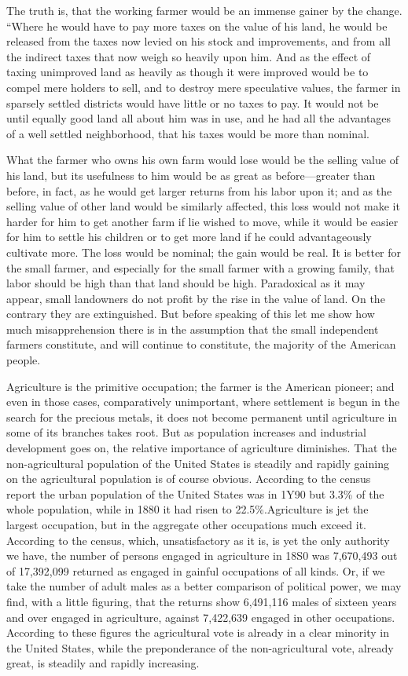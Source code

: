 \documentclass{book}
\begin{document}
The truth is, that the working farmer would be an immense gainer by the change. “Where he would have to pay more taxes on the value of his land, he would be released from the taxes now levied on his stock and improvements, and from all the indirect taxes that now weigh so heavily upon him. And as the effect of taxing unimproved land as heavily as though it were improved would be to compel mere holders to sell, and to destroy mere speculative values, the farmer in sparsely settled districts would have little or no taxes to pay. It would not be until equally good land all about him was in use, and he had all the advantages of a well settled neighborhood, that his taxes would be more than nominal.

What the farmer who owns his own farm would lose would be the selling value of his land, but its usefulness to him would be as great as before—greater than before, in fact, as he would get larger returns from his labor upon it; and as the selling value of other land would be similarly affected, this loss would not make it harder for him to get another farm if lie wished to move, while it would be easier for him to settle his children or to get more land if he could advantageously cultivate more. The loss would be nominal; the gain would be real. It is better for the small farmer, and especially for the small farmer with a growing family, that labor should be high than that land should be high. Paradoxical as it may appear, small landowners do not profit by the rise in the value of land. On the contrary they are extinguished. But before speaking of this let me show how much misapprehension there is in the assumption that the small independent farmers constitute, and will continue to constitute, the majority of the American people.

Agriculture is the primitive occupation; the farmer is the American pioneer; and even in those cases, comparatively unimportant, where settlement is begun in the search for the precious metals, it does not become permanent until agriculture in some of its branches takes root. But as population increases and industrial development goes on, the relative importance of agriculture diminishes. That the non-agricultural population of the United States is steadily and rapidly gaining on the agricultural population is of course obvious. According to the census report the urban population of the United States was in 1Y90 but 3.3\% of the whole population, while in 1880 it had risen to 22.5\%.\footnotemark[1] Agriculture is jet the largest occupation, but in the aggregate other occupations much exceed it. According to the census, which, unsatisfactory as it is, is yet the only authority we have, the number of persons engaged in agriculture in 18S0 was 7,670,493 out of 17,392,099 returned as engaged in gainful occupations of all kinds. Or, if we take the number of adult males as a better comparison of political power, we may find, with a little figuring, that the returns show 6,491,116 males of sixteen years and over engaged in agriculture, against 7,422,639 engaged in other occupations. According to these figures the agricultural vote is already in a clear minority in the United States, while the preponderance of the non-agricultural vote, already great, is steadily and rapidly increasing.\footnotemark[2]
\end{document}
